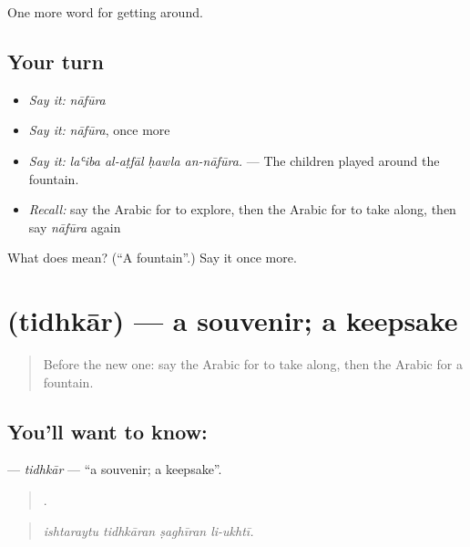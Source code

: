 \begin{grammarlens}[title={What you've built}]
One more word for getting around.
\end{grammarlens}

\subsection*{Your turn}
\begin{itemize}
\raggedright
  \item \emph{Say it:} \emph{nāfūra}
  \item \emph{Say it:} \emph{nāfūra}, once more
  \item \emph{Say it:} \emph{laʿiba al-aṭfāl ḥawla an-nāfūra.} — The children played around the fountain.
  \item \emph{Recall:} say the Arabic for to explore, then the Arabic for to take along, then say \emph{nāfūra} again
\end{itemize}

\begin{tcolorbox}[breakable,colback=teal!4,colframe=teal!35!black,title={Before you move on}]
What does  mean? (\textquotedblleft{}A fountain\textquotedblright{}.) Say it once more.
\end{tcolorbox}
\section[\texorpdfstring{\ar{تذكار} (tidhkār)}{تذكار (tidhkār)}]{ (tidhkār) — a souvenir; a keepsake}

\label{lesson:AR-C440-tidhkar}



\begin{quote}
Before the new one: say the Arabic for to take along, then the Arabic for a fountain.
\end{quote}

\subsection*{You'll want to know: }
\textbf{} — \emph{tidhkār} — \textquotedblleft{}a souvenir; a keepsake\textquotedblright{}.

\begin{quote}
   .
\end{quote}

\begin{quote}
\emph{ishtaraytu tidhkāran ṣaghīran li-ukhtī.}
\end{quote}

